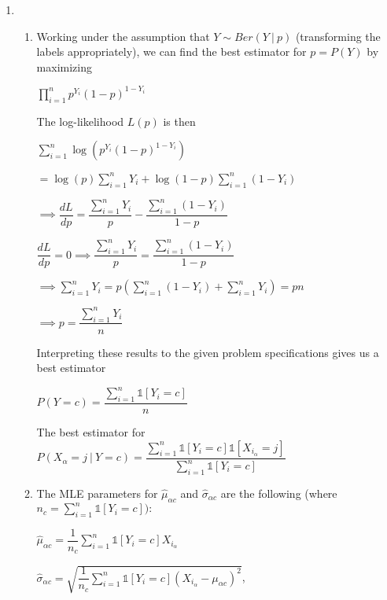 \documentclass{article}
\begin{document}
\begin{enumerate}[label=(\alph*)]
\item
\begin{enumerate}[label=(\roman*)]
    \item Working under the assumption that $Y \sim Ber(Y\:|\:p)$ (transforming the labels appropriately), we can find the best estimator for $p = P(Y)$ by maximizing
    \begin{center}$\prod_{i=1}^{n}p^{Y_i}(1 - p)^{1-Y_i}$\end{center}
    The log-likelihood $L(p)$ is then
    \begin{center}$\sum_{i=1}^{n}\log(p^{Y_i}(1 - p)^{1-Y_i})$ \end{center}
    \begin{center}$= \log(p)\sum_{i=1}^{n}Y_i + \log(1 - p)\sum_{i=1}^{n}(1 - Y_i)$ \end{center}
    \begin{center}$\implies \dfrac{dL}{dp} = \dfrac{\sum_{i=1}^{n}Y_i}{p} - \dfrac{\sum_{i=1}^{n}(1 - Y_i)}{1-p}$ \end{center}
    \begin{center}$\dfrac{dL}{dp} = 0 \implies \dfrac{\sum_{i=1}^{n}Y_i}{p} = \dfrac{\sum_{i=1}^{n}(1 - Y_i)}{1-p}$\end{center}
    \begin{center}$\implies \sum_{i=1}^{n}Y_i = p(\sum_{i=1}^{n}(1 - Y_i) + \sum_{i=1}^{n}Y_i) = pn$\end{center}
    \begin{center}$\implies p = \dfrac{\sum_{i=1}^{n}Y_i}{n}$ \end{center}
    Interpreting these results to the given problem specifications gives us a best estimator\\
    \begin{center}$P(Y=c) = \dfrac{\sum_{i=1}^{n}\mathds{1}[Y_i = c]}{n}$\end{center}
    The best estimator for $P(X_\alpha=j\:|\:Y=c) = \dfrac{\sum_{i=1}^{n}\mathds{1}[Y_i = c]\mathds{1}[X_{i_\alpha} = j]}
    {\sum_{i=1}^{n}\mathds{1}[Y_i = c]}$\\
    
    \item The MLE parameters for $\hat{\mu}_{\alpha c}$ and $\hat{\sigma}_{\alpha c}$ are the following (where $n_c = \sum_{i=1}^{n}\mathds{1}[Y_i = c]):$
    \begin{center}$\hat{\mu}_{\alpha c} = \dfrac{1}{n_c}\sum_{i=1}^{n}\mathds{1}[Y_i = c]X_{i_\alpha}$\end{center}
    \begin{center}$\hat{\sigma}_{\alpha c} = \sqrt{\dfrac{1}{n_c}\sum_{i=1}^{n}\mathds{1}[Y_i = c](X_{i_\alpha} - \mu_{\alpha c})^2}$,\end{center}
    

\end{enumerate}
\end{enumerate}
\end{document}
